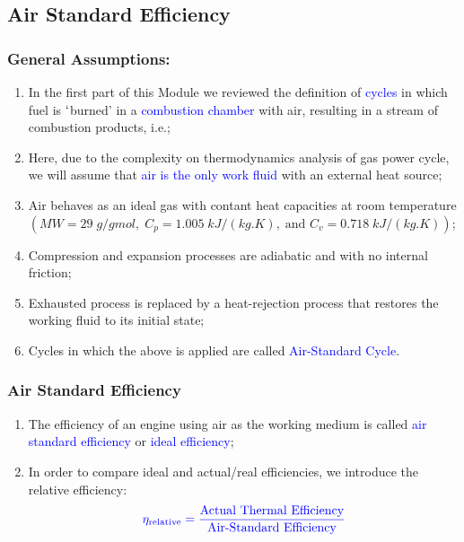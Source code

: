\documentclass[10pt,compress]{beamer}
\begin{document}
\subsection{Air Standard Efficiency}
\begin{frame}
 \frametitle{General Assumptions:}
  \begin{enumerate}
   \item <1-> In the first part of this Module we reviewed the definition of \textcolor{blue}{cycles} in which fuel is $\lq$burned' in a \textcolor{blue}{combustion chamber} with air, resulting in a stream of combustion products, i.e.;
   \item <2-> Here, due to the complexity on thermodynamics analysis of gas power cycle, we will assume that \textcolor{blue}{air is the only work fluid} with an external heat source;
   \item <3-> Air behaves as an ideal gas with contant heat capacities at room  temperature $\left(MW=29\;g/gmol,\;C_{p}=1.005\;kJ/(kg.K),\;\text{and }C_{v}=0.718\;kJ/(kg.K)\right)$;
   \item <4-> Compression and expansion processes are adiabatic and with no internal friction;
   \item <5-> Exhausted process is replaced by a heat-rejection process that restores the working fluid to its initial state;
   \item <6-> Cycles in which the above is applied are called \textcolor{blue}{Air-Standard Cycle}.
  \end{enumerate}
\end{frame}

\begin{frame}
 \frametitle{Air Standard Efficiency}
  \begin{enumerate}
   \item The efficiency of an engine using air as the working medium is called \textcolor{blue}{air standard efficiency} or \textcolor{blue}{ideal efficiency};
   \item In order to compare ideal and actual/real efficiencies, we introduce the relative efficiency:
    \begin{displaymath}
      \textcolor{blue}{\eta_{\text{relative}}=\displaystyle\frac{\text{Actual Thermal Efficiency}}{\text{Air-Standard Efficiency}}}
    \end{displaymath}
  \end{enumerate}
\end{frame}
\end{document}
